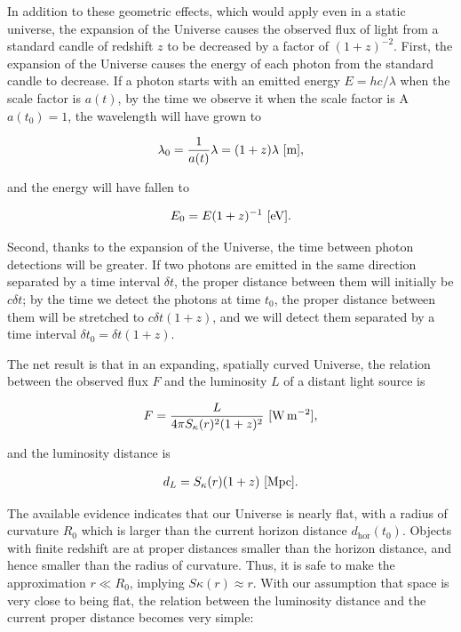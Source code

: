 \documentclass[a4paper,11pt]{article}
\begin{document}
{\noindent}In addition to these geometric effects, which would apply even in a static universe, the expansion of the Universe causes the observed flux of light from a standard candle of redshift $z$ to be decreased by a factor of $(1+z)^{−2}$. First, the expansion of the Universe causes the energy of each photon from the standard candle to decrease. If a photon starts with an emitted energy $E = hc/λ$ when the scale factor is $a(t)$, by the time we observe it when the scale factor is A$a(t_0) = 1$, the wavelength will have grown to

\begin{align*}
    \lambda_0 = \frac{1}{a(t)}\lambda = (1+z)\lambda ~ [{\rm m}],
\end{align*}

{\noindent}and the energy will have fallen to

\begin{align*}
    E_0 = E(1+z)^{-1} ~ [{\rm eV}].
\end{align*}

{\noindent}Second, thanks to the expansion of the Universe, the time between photon detections will be greater. If two photons are emitted in the same direction separated by a time interval $\delta t$, the proper distance between them will initially be $c\delta t$; by the time we detect the photons at time $t_0$, the proper distance between them will be stretched to $c\delta t(1 + z)$, and we will detect them separated by a time interval $\delta t_0 = \delta t(1 + z)$.

{\noindent}The net result is that in an expanding, spatially curved Universe, the relation between the observed flux $F$ and the luminosity $L$ of a distant light source is

\begin{align*}
    F = \frac{L}{4\pi S_\kappa(r)^2(1+z)^2} ~ [{\rm W\,m^{-2}}],
\end{align*}

{\noindent}and the luminosity distance is

\begin{align*}
    d_L = S_\kappa(r)(1+z) ~ [{\rm Mpc}].
\end{align*}

{\noindent}The available evidence indicates that our Universe is nearly flat, with a radius of curvature $R_0$ which is larger than the current horizon distance $d_\mathrm{hor}(t_0)$. Objects with finite redshift are at proper distances smaller than the horizon distance, and hence smaller than the radius of curvature. Thus, it is safe to make the approximation $r \ll R_0$, implying $S\kappa(r) \approx r$. With our assumption that space is very close to being flat, the relation between the luminosity distance and the current proper distance becomes very simple:
\end{document}
